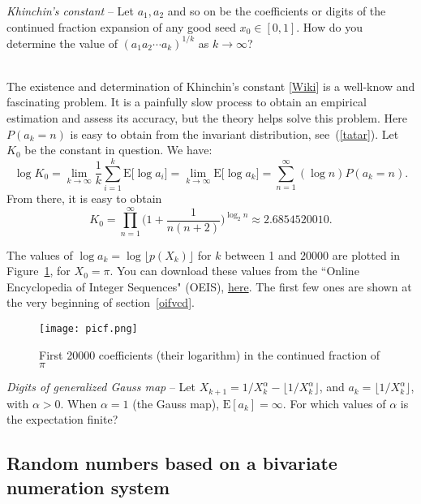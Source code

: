 \documentclass[oneside,10pt]{book}
\begin{document}
\begin{Exercise} {\em Khinchin's constant} -- Let $a_1,a_2$ and so on be the coefficients or digits of the continued fraction expansion of any  
good seed $x_0\in [0,1]$. How do you determine the value of $(a_1 a_2\cdots a_k)^{1/k}$ as $k\rightarrow\infty$?
 \vspace{1ex}

 \\
The existence and determination of \textcolor{index}{Khinchin's constant} [\href{https://en.wikipedia.org/wiki/Khinchin\%27s_constant}{Wiki}] is a well-know and fascinating problem. It is a painfully slow process to obtain an empirical estimation and assess its accuracy, but
 the theory helps solve this problem. Here $P(a_k = n)$ is easy to obtain from the invariant distribution, see~(\ref{tatar}). Let $K_0$ be the constant in question. We have:
$$\log K_0 = \lim_{k\rightarrow\infty} \frac{1}{k}\sum_{i=1}^k \text{E}\Big[\log a_i\Big] =\lim_{k\rightarrow\infty} 
\text{E}\Big[\log a_k\Big] = 
\sum_{n=1}^\infty (\log n) P(a_k=n).$$
From there, it is easy to obtain
$$K_0 = \prod_{n=1}^\infty \Bigg(1+\frac{1}{n(n+2)}\Bigg)^{\log_2 n} \approx 2.6854520010.$$

\noindent The values of $\log a_k = \log \lfloor p(X_k)\rfloor$ for $k$ between 1 and $\num{20000}$ are plotted in Figure~\ref{fig:picf},
 for $X_0 =\pi$. You can download these values from the
``Online Encyclopedia of Integer Sequences" (OEIS), \href{https://oeis.org/A001203}{here}.  The first few ones are shown at the very beginning of section~\ref{oifvcd}.
\end{Exercise}

\begin{figure}[H]
\centering
\texttt{[image: picf.png]}  
\caption{First \num{20000} coefficients (their logarithm) in the continued fraction of $\pi$}
\label{fig:picf}
\end{figure}

\begin{Exercise} {\em Digits of generalized Gauss map} -- Let $X_{k+1} = 1/X_k^\alpha  -\lfloor 1/X_k^\alpha\rfloor$, and
$a_k = \lfloor 1/X_k^\alpha\rfloor$, with $\alpha>0$. When $\alpha=1$ (the Gauss map), $\text{E}[a_k]=\infty$. For which values
 of $\alpha$ is the expectation finite?
\end{Exercise}

\subsection{Random numbers based on a bivariate numeration system}\label{vcxzaq}
\end{document}

